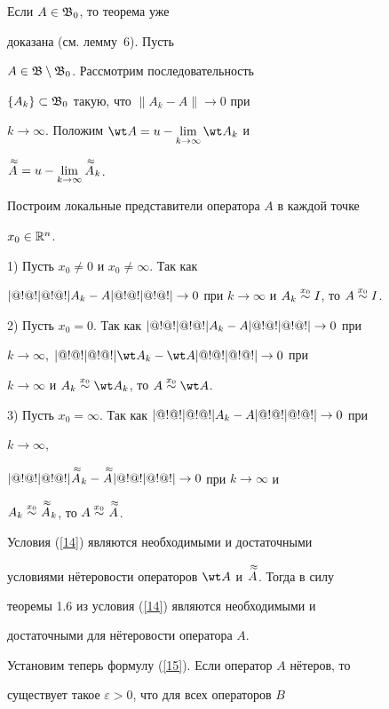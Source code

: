 \begin{pf}


Если $A\in \frak B_0$, то теорема уже


доказана (см. лемму~6). Пусть


$A\in\frak B\setminus\frak B_0$. Рассмотрим последовательность


$\{A_k\}\subset\frak B_0$ такую, что $\|A_k-A\|\to 0$ при


$k\to\infty$. Положим $\dst \wt A=u-\lim_{k\to\infty}\wt A_k$ и


$\displaystyle \overset{\;\approx}{A}{}=u-\lim_{k\to\infty}\overset{\;\approx}{A}{}_k$.


Построим локальные представители оператора $A$ в каждой точке


$x_0\in\Bbb R^n$.





1) Пусть $x_0\ne 0$ и $x_0\ne\infty$. Так как


$|@!@!|@!@!| A_k-A|@!@!|@!@!|\to 0$ при $k\to\infty$ и $A_k\overset{x_0}{\sim}{} I$, то $A\overset{x_0}{\sim}{} I$.





2) Пусть $x_0=0$. Так как $|@!@!|@!@!| A_k-A|@!@!|@!@!|\to 0$ при


$k\to\infty$, $\trivert \wt A_k-\wt A\trivert\to 0$ при


$k\to\infty$ и $A_k\xO\wt A_k$, то $A\xO\wt A$.





3) Пусть ${x_0=\infty}$. Так как ${|@!@!|@!@!| A_k-A|@!@!|@!@!|\to 0}$ при


${k\to\infty}$,


$|@!@!|@!@!| \overset{\;\approx}{A}{}_k-\overset{\;\approx}{A}{}|@!@!|@!@!|\to 0$ при $k\to\infty$ и


$A_k\overset{x_0}{\sim}{}\overset{\;\approx}{A}{}_k$, то $A\overset{x_0}{\sim}{}\overset{\;\approx}{A}{}$.





Условия (\ref{14}) являются необходимыми и достаточными


условиями н\"етеровости операторов $\wt A$ и $\overset{\;\approx}{A}{}$. Тогда в силу


теоремы 1.6 из \cite{b4} условия (\ref{14}) являются необходимыми и


достаточными для н\"етеровости оператора $A$.





Установим теперь формулу (\ref{15}). Если оператор $A$ н\"етеров, то


существует такое $\varepsilon>0$, что для всех операторов $B$



\end{pf}
